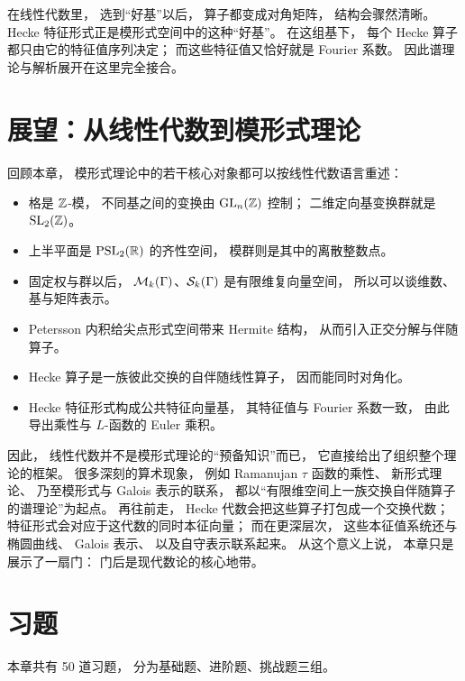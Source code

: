 \begin{remark} 在线性代数里， 选到“好基”以后， 算子都变成对角矩阵， 结构会骤然清晰。 Hecke 特征形式正是模形式空间中的这种“好基”。 在这组基下， 每个 Hecke 算子都只由它的特征值序列决定； 而这些特征值又恰好就是 Fourier 系数。 因此谱理论与解析展开在这里完全接合。 \end{remark}




\section{展望：从线性代数到模形式理论}




回顾本章， 模形式理论中的若干核心对象都可以按线性代数语言重述：




\begin{itemize} \item 格是 $\mathbb{Z}$-模， 不同基之间的变换由 $\mathrm{GL}_n(\mathbb{Z})$ 控制； 二维定向基变换群就是 $\mathrm{SL}_2(\mathbb{Z})$。 \item 上半平面是 $\mathrm{PSL}_2(\mathbb{R})$ 的齐性空间， 模群则是其中的离散整数点。 \item 固定权与群以后， $\mathcal{M}_k(\Gamma)$、$\mathcal{S}_k(\Gamma)$ 是有限维复向量空间， 所以可以谈维数、基与矩阵表示。 \item Petersson 内积给尖点形式空间带来 Hermite 结构， 从而引入正交分解与伴随算子。 \item Hecke 算子是一族彼此交换的自伴随线性算子， 因而能同时对角化。 \item Hecke 特征形式构成公共特征向量基， 其特征值与 Fourier 系数一致， 由此导出乘性与 $L$-函数的 Euler 乘积。 \end{itemize} 因此， 线性代数并不是模形式理论的“预备知识”而已， 它直接给出了组织整个理论的框架。 很多深刻的算术现象， 例如 Ramanujan $\tau$ 函数的乘性、 新形式理论、 乃至模形式与 Galois 表示的联系， 都以“有限维空间上一族交换自伴随算子的谱理论”为起点。 再往前走， Hecke 代数会把这些算子打包成一个交换代数； 特征形式会对应于这代数的同时本征向量； 而在更深层次， 这些本征值系统还与椭圆曲线、 Galois 表示、 以及自守表示联系起来。 从这个意义上说， 本章只是展示了一扇门： 门后是现代数论的核心地带。




\section*{习题}




本章共有 50 道习题， 分为基础题、进阶题、挑战题三组。




